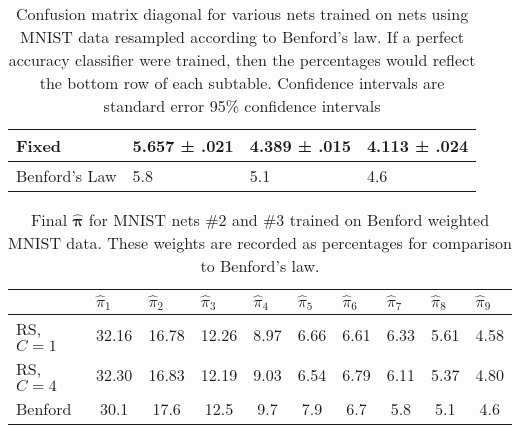 \begin{table}[ht]
\begin{tabular}{l|l|l|l|}
	\multicolumn{1}{|l|}{Fixed}         & 5.657 ± .021      & 4.389 ± .015      & 4.113 ± .024      \\ \hline
	\multicolumn{1}{|l|}{Benford's Law} & 5.8               & 5.1               & 4.6               \\ \hline
\end{tabular}
\caption[Confusion matrix diagonal for MNIST nets \#1-\#4]{Confusion matrix diagonal for various nets trained on nets using MNIST data resampled according to Benford's law. If a perfect accuracy classifier were trained, then the percentages would reflect the bottom row of each subtable. Confidence intervals are standard error 95\% confidence intervals}
\end{table}

\begin{table}[ht]
	\renewcommand{\arraystretch}{1.4}
	\centering
	\begin{tabular}{l|c|c|c|c|c|c|c|c|c|}
		\cline{2-10}
		& \multicolumn{1}{l|}{$\hat{\pi}_1$} & \multicolumn{1}{l|}{$\hat{\pi}_2$} & \multicolumn{1}{l|}{$\hat{\pi}_3$} & \multicolumn{1}{l|}{$\hat{\pi}_4$} & \multicolumn{1}{l|}{$\hat{\pi}_5$} & \multicolumn{1}{l|}{$\hat{\pi}_6$} & \multicolumn{1}{l|}{$\hat{\pi}_7$} & \multicolumn{1}{l|}{$\hat{\pi}_8$} & \multicolumn{1}{l|}{$\hat{\pi}_9$} \\ \hline
		\multicolumn{1}{|l|}{RS, $C=1$} & 32.16                              & 16.78                              & 12.26                              & 8.97                               & 6.66                               & 6.61                               & 6.33                               & 5.61                               & 4.58                               \\ \hline
		\multicolumn{1}{|l|}{RS, $C=4$} & 32.30                              & 16.83                              & 12.19                              & 9.03                               & 6.54                               & 6.79                               & 6.11                               & 5.37                               & 4.80                               \\ \hline
		\multicolumn{1}{|l|}{Benford}   & 30.1                               & 17.6                               & 12.5                               & 9.7                                & 7.9                                & 6.7                                & 5.8                                & 5.1                                & 4.6                                \\ \hline
	\end{tabular}
	\caption[MLE of class weights for MNIST nets \#2 and \#3]{Final \( \hat{\bm \pi} \) for MNIST nets \#2 and \#3 trained on Benford weighted MNIST data. These weights are recorded as percentages for comparison to Benford's law.}\label{table:benfordPiHat}
\end{table}

\FloatBarrier